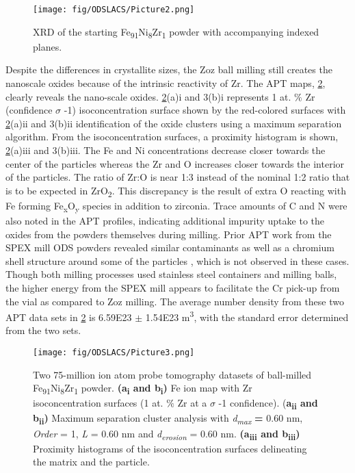 			\begin{figure}
				\centering
				\texttt{[image: fig/ODSLACS/Picture2.png]}
				\caption{XRD of the starting Fe\textsubscript{91}Ni\textsubscript{8}Zr\textsubscript{1 }powder with accompanying indexed planes.}
				\label{fig:ODSLACS2}
			\end{figure}



	 		Despite the differences in crystallite sizes, the Zoz ball milling still creates the nanoscale oxides because of the intrinsic reactivity of Zr. The APT maps, \ref{fig:ODSLACS3}, clearly reveals the nano-scale oxides. \ref{fig:ODSLACS3}(a)i and 3(b)i represents 1 at. $\%$  Zr (confidence $ \sigma $ -1) isoconcentration surface shown by the red-colored surfaces with \ref{fig:ODSLACS3}(a)ii and 3(b)ii identification of the oxide clusters using a maximum separation algorithm. From the isoconcentration surfaces, a proximity histogram is shown, \ref{fig:ODSLACS3}(a)iii and 3(b)iii. The Fe and Ni concentrations decrease closer towards the center of the particles whereas the Zr and O increases closer towards the interior of the particles. The ratio of Zr:O is near 1:3 instead of the nominal 1:2 ratio that is to be expected in ZrO\textsubscript{2}. This discrepancy is the result of extra O reacting with Fe forming Fe\textsubscript{x}O\textsubscript{y }species in addition to zirconia. Trace amounts of C and N were also noted in the APT profiles, indicating additional impurity uptake to the oxides from the powders themselves during milling. Prior APT work from the SPEX mill ODS powders revealed similar contaminants as well as a chromium shell structure around some of the particles \cite{RN267}, which is not observed in these cases. Though both milling processes used stainless steel containers and milling balls, the higher energy from the SPEX mill appears to facilitate the Cr pick-up from the vial as compared to Zoz milling. The average number density from these two APT data sets in \ref{fig:ODSLACS3} is 6.59E23 $ \pm $  1.54E23 m\textsuperscript{3}, with the standard error determined from the two sets. 


			\begin{figure}
				\centering
				\texttt{[image: fig/ODSLACS/Picture3.png]}
				\caption[Two atom probe tomography datasets of ball-milled Fe\textsubscript{91}Ni\textsubscript{8}Zr\textsubscript{1 }powder.]{Two 75-million ion atom probe tomography datasets of ball-milled Fe\textsubscript{91}Ni\textsubscript{8}Zr\textsubscript{1 }powder. \textbf{(a\textsubscript{i} and b\textsubscript{i}) }Fe ion map with Zr isoconcentration surfaces (1 at. $\%$  Zr at a $ \sigma $ -1 confidence). (\textbf{a\textsubscript{ii} and b\textsubscript{ii}) }Maximum separation cluster analysis with \textit{d\textsubscript{max}}\textsubscript{ }\textbf{= }0.60 nm, \textit{Order} = 1, \textit{L} = 0.60 nm and \textit{d\textsubscript{erosion}} = 0.60 nm. \textbf{(a\textsubscript{iii} and b\textsubscript{iii}) }Proximity histograms of the isoconcentration surfaces delineating the matrix and the particle.}
				\label{fig:ODSLACS3}
			\end{figure}




